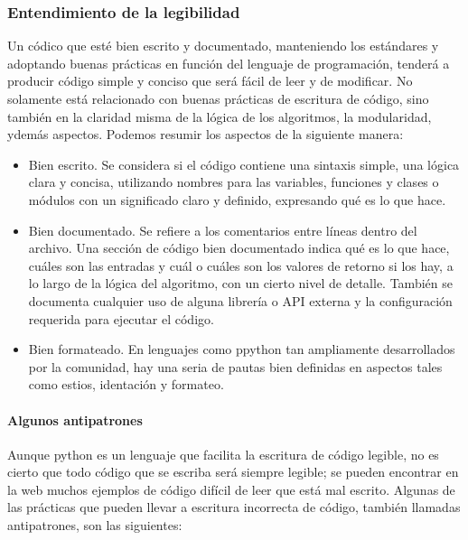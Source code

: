 \subsubsection{Entendimiento de la legibilidad} Un códico que esté bien escrito y documentado, manteniendo los estándares y adoptando buenas prácticas en función del lenguaje de programación, tenderá a producir código simple y conciso que será fácil de leer y de modificar. No solamente está relacionado con buenas prácticas de escritura de código, sino también en la claridad misma de la lógica de los algoritmos, la modularidad, ydemás aspectos. Podemos resumir los aspectos de la siguiente manera:


\begin{itemize}
    \item Bien escrito. Se considera si el código contiene una sintaxis simple, una lógica clara y concisa, utilizando nombres para las variables, funciones y clases o módulos con un significado claro y definido, expresando qué es lo que hace.
    \item Bien documentado. Se refiere a los comentarios entre líneas dentro del archivo. Una sección de código bien documentado indica qué es lo que hace, cuáles son las entradas y cuál o cuáles son los valores de retorno si los hay, a lo largo de la lógica del algoritmo, con un cierto nivel de detalle. También se documenta cualquier uso de alguna librería o API externa y la configuración requerida para ejecutar el código.
    \item Bien formateado. En lenguajes como ppython tan ampliamente desarrollados por la comunidad, hay una seria de pautas bien definidas en aspectos tales como estios, identación y formateo.
\end{itemize}

\paragraph{Algunos antipatrones} Aunque python es un lenguaje que facilita la escritura de código legible, no es cierto que todo código que se escriba será siempre legible; se pueden encontrar en la web muchos ejemplos de código difícil de leer que está mal escrito. Algunas de las prácticas que pueden llevar a escritura incorrecta de código, también llamadas antipatrones, son las siguientes:


